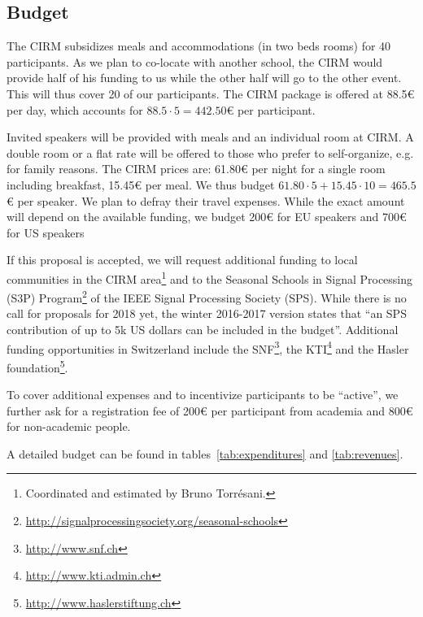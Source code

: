 \documentclass[a4paper]{scrartcl}
\begin{document}
\subsection{Budget}

The CIRM subsidizes meals and accommodations (in two beds rooms) for 40
participants. As we plan to co-locate with another school, the CIRM would
provide half of his funding to us while the other half will go to the other
event. This will thus cover 20 of our participants. The CIRM package is offered
at 88.5€ per day, which accounts for $88.5 \cdot 5 = 442.50$€ per participant.

Invited speakers will be provided with meals and an individual room at CIRM. A
double room or a flat rate will be offered to those who prefer to self-organize,
e.g. for family reasons. The CIRM prices are: 61.80€ per night for a single room
including breakfast, 15.45€ per meal. We thus budget $61.80 \cdot 5 + 15.45
\cdot 10 = 465.5$€ per speaker. We plan to defray their travel expenses. While
the exact amount will depend on the available funding, we budget 200€ for EU
speakers and 700€ for US speakers

If this proposal is accepted, we will request additional funding to local
communities in the CIRM area\footnote{Coordinated and estimated by Bruno
Torrésani.} and to the Seasonal Schools in Signal Processing (S3P)
Program\footnote{\url{http://signalprocessingsociety.org/seasonal-schools}} of
the IEEE Signal Processing Society (SPS). While there is no call for proposals
for 2018 yet, the winter 2016-2017 version states that ``an SPS contribution of
up to 5k US dollars can be included in the budget''. Additional funding
opportunities in Switzerland include the SNF\footnote{\url{http://www.snf.ch}},
the KTI\footnote{\url{http://www.kti.admin.ch}} and the Hasler
foundation\footnote{\url{http://www.haslerstiftung.ch}}.

To cover additional expenses and to incentivize participants to be ``active'',
we further ask for a registration fee of 200€ per participant from academia and
800€ for non-academic people.

A detailed budget can be found in tables~\ref{tab:expenditures} and
\ref{tab:revenues}.
\end{document}
